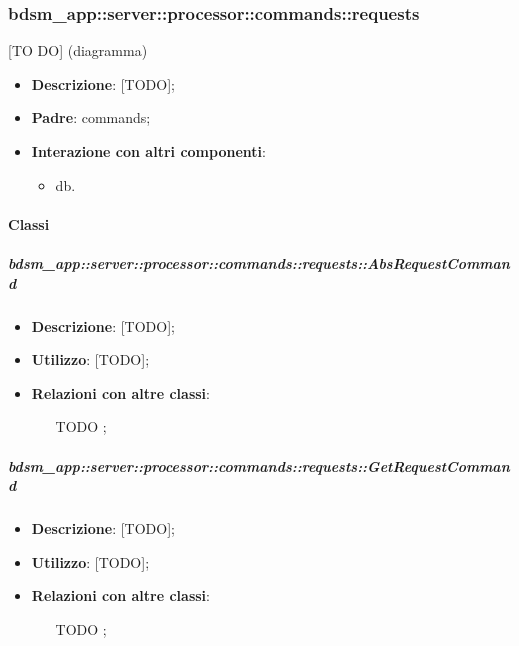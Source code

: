       \subsubsection{bdsm\_app::server::processor::commands::requests} %
      \label{ssub:bdsm_app_server_processor_commands_requests}
      [TO DO] (diagramma) \newline \newline

      \begin{itemize}
        \item \textbf{Descrizione}: [TODO];
        \item \textbf{Padre}: commands;
        \item \textbf{Interazione con altri componenti}:
          \begin{itemize}
            \item db.
          \end{itemize}
      \end{itemize}

        \paragraph{Classi} %

        \subparagraph{bdsm\_app::server::processor::commands::requests::AbsRequestCommand} %
        \label{subp:bdsm_app_server_processor_commands_requests_absrequestcommand}
        \begin{itemize}
          \item \textbf{Descrizione}: [TODO];
          \item \textbf{Utilizzo}: [TODO];
          \item \textbf{Relazioni con altre classi}:
            \begin{itemize}
              \item [TODO];
            \end{itemize}
        \end{itemize}

        \subparagraph{bdsm\_app::server::processor::commands::requests::GetRequestCommand} %
        \label{subp:bdsm_app_server_processor_commands_requests_getrequestcommand}
        \begin{itemize}
          \item \textbf{Descrizione}: [TODO];
          \item \textbf{Utilizzo}: [TODO];
          \item \textbf{Relazioni con altre classi}:
            \begin{itemize}
              \item [TODO];
            \end{itemize}
        \end{itemize}

